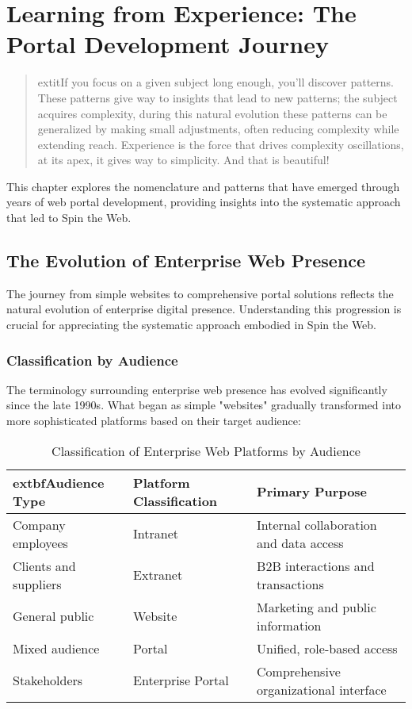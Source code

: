 
\chapter{Learning from Experience: The Portal Development Journey}
\label{chap:learning}

\begin{quote}
	extit{If you focus on a given subject long enough, you'll discover patterns. These patterns give way to insights that lead to new patterns; the subject acquires complexity, during this natural evolution these patterns can be generalized by making small adjustments, often reducing complexity while extending reach. Experience is the force that drives complexity oscillations, at its apex, it gives way to simplicity. And that is beautiful!}
\end{quote}

This chapter explores the nomenclature and patterns that have emerged through years of web portal development, providing insights into the systematic approach that led to Spin the Web.

\section{The Evolution of Enterprise Web Presence}

The journey from simple websites to comprehensive portal solutions reflects the natural evolution of enterprise digital presence. Understanding this progression is crucial for appreciating the systematic approach embodied in Spin the Web.

\subsection{Classification by Audience}

The terminology surrounding enterprise web presence has evolved significantly since the late 1990s. What began as simple "websites" gradually transformed into more sophisticated platforms based on their target audience:

\begin{table}[htbp]
\centering
\caption{Classification of Enterprise Web Platforms by Audience}
\label{tab:audience-classification}
\begin{tabular}{|l|l|l|}
\hline
	extbf{Audience Type} & \textbf{Platform Classification} & \textbf{Primary Purpose} \\
\hline
Company employees & Intranet & Internal collaboration and data access \\
\hline
Clients and suppliers & Extranet & B2B interactions and transactions \\
\hline
General public & Website & Marketing and public information \\
\hline
Mixed audience & Portal & Unified, role-based access \\
\hline
Stakeholders & Enterprise Portal & Comprehensive organizational interface \\
\hline
\end{tabular}
\end{table}

